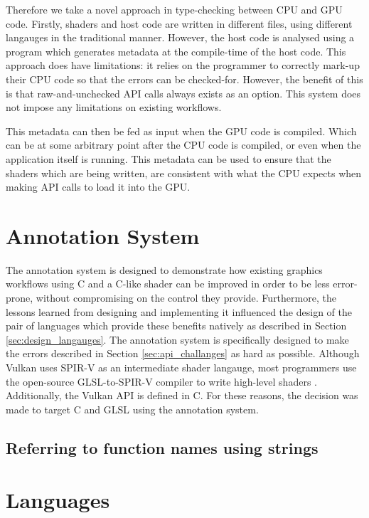\documentclass[a4paper,12pt,twoside,openright]{report}
\begin{document}
Therefore we take a novel approach in type-checking between CPU and GPU code.
Firstly, shaders and host code are written in different files, using different
langauges in the traditional manner. However, the host code is analysed using a
program which generates metadata at the compile-time of the host code. This
approach does have limitations: it relies on the programmer to correctly
mark-up their CPU code so that the errors can be checked-for. However, the
benefit of this is that raw-and-unchecked API calls always exists as an option.
This system does not impose any limitations on existing workflows.

This metadata can then be fed as input when the GPU code is compiled. Which can
be at some arbitrary point after the CPU code is compiled, or even when the
application itself is running. This metadata can be used to ensure that the
shaders which are being written, are consistent with what the CPU expects when
making API calls to load it into the GPU.

\section{Annotation System}

\label{sec:design_annotation_processor}

The annotation system is designed to demonstrate how existing graphics
workflows using C and a C-like shader can be improved in order to be less
error-prone, without compromising on the control they provide. Furthermore, the
lessons learned from designing and implementing it influenced the design of the
pair of languages which provide these benefits natively as described in Section
\ref{sec:design_langauges}. The annotation system is specifically designed to
make the errors described in Section \ref{sec:api_challanges} as hard as
possible. Although Vulkan uses SPIR-V as an intermediate shader langauge, most
programmers use the open-source GLSL-to-SPIR-V compiler to write high-level
shaders \cite{TODO}. Additionally, the Vulkan API is defined in C. For these
reasons, the decision was made to target C and GLSL using the annotation
system.

\subsection{Referring to function names using strings}

\section{Languages}
\end{document}
